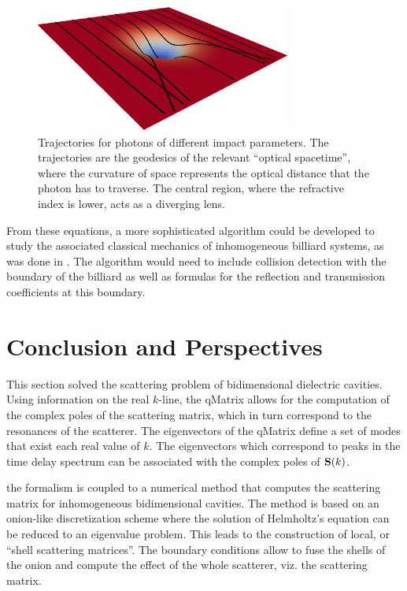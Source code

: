 \begin{figure}
 \centering
 \includegraphics[width=0.75\textwidth]{figs/passive/geodesics-1.eps}
 \caption[Photon trajectories in a Gaussian deformation of the refractive index]
	  {Trajectories for photons of different impact parameters. The trajectories are
	  the geodesics of the relevant ``optical spacetime'', where the curvature of 
	  space represents the optical distance that the photon has to traverse. The central
	  region, where the refractive index is lower, acts as a diverging lens.}
 \label{fig:passive.gaussian.geodesics}
\end{figure}

From these equations, a more sophisticated algorithm could be developed to study
the associated classical mechanics of inhomogeneous billiard systems, as was done
in \cite{SAI2005}. The algorithm would need to include collision detection with the 
boundary of the billiard as well as formulas for the reflection and transmission coefficients
at this boundary.

\section{Conclusion and Perspectives}
This section solved the scattering problem of bidimensional
dielectric cavities. Using information on the real $k$-line,
the \gls{qMatrix} allows for the computation of the complex poles
of the scattering matrix, which in turn correspond to the resonances
of the scatterer. The eigenvectors of the \gls{qMatrix} define 
a set of modes that exist each real value of $k$. The eigenvectors
which correspond to peaks in the time delay spectrum can be associated
with the complex poles of $\mathbf{S}(k)$.

the formalism is coupled to a numerical method that computes 
the scattering matrix for inhomogeneous bidimensional cavities.
The method is based on an onion-like discretization scheme
where the solution of Helmholtz's equation can be reduced to an 
eigenvalue problem. This leads to the construction of local, or 
``shell scattering matrices''. The boundary conditions allow to fuse
the shells of the onion and compute the effect of the whole scatterer, 
viz. the scattering matrix.

